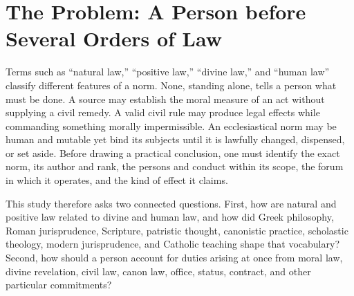 \section{The Problem: A Person before Several Orders of Law}

Terms such as ``natural law,'' ``positive law,'' ``divine law,'' and ``human law'' classify different features of a norm. None, standing alone, tells a person what must be done. A source may establish the moral measure of an act without supplying a civil remedy. A valid civil rule may produce legal effects while commanding something morally impermissible. An ecclesiastical norm may be human and mutable yet bind its subjects until it is lawfully changed, dispensed, or set aside. Before drawing a practical conclusion, one must identify the exact norm, its author and rank, the persons and conduct within its scope, the forum in which it operates, and the kind of effect it claims.

This study therefore asks two connected questions. First, how are natural and positive law related to divine and human law, and how did Greek philosophy, Roman jurisprudence, Scripture, patristic thought, canonistic practice, scholastic theology, modern jurisprudence, and Catholic teaching shape that vocabulary? Second, how should a person account for duties arising at once from moral law, divine revelation, civil law, canon law, office, status, contract, and other particular commitments?


